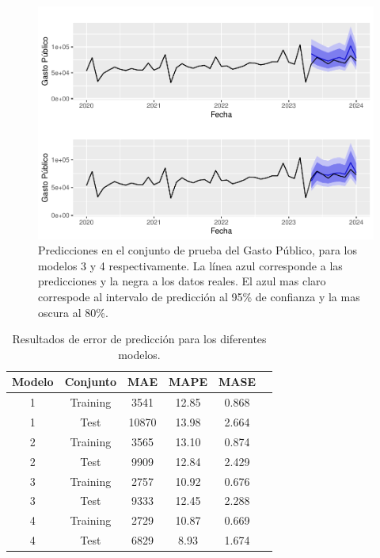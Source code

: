 \documentclass[
  12pt,
]{article}
\begin{document}
\begin{figure}[H]

{\centering \includegraphics[width=0.95\linewidth]{informe_files/figure-latex/unnamed-chunk-22-1}

}

\caption{\label{fig:unnamed-chunk-22} Predicciones en el conjunto de prueba del Gasto
Público, para los modelos 3 y 4 respectivamente. La línea azul
corresponde a las predicciones y la negra a los datos reales. El azul
mas claro correspode al intervalo de predicción al 95\% de confianza y
la mas oscura al 80\%.}

\end{figure}

\begin{table}[H]
\centering
\begin{tabular}{c c c c c c}
\hline
Modelo & Conjunto & MAE & MAPE & MASE \\ \hline
1 & Training  & 3541 & 12.85 & 0.868 \\ 
1 & Test      & 10870 & 13.98 & 2.664 \\ \hline
2 & Training  & 3565 & 13.10 & 0.874 \\ 
2 & Test      & 9909 & 12.84 & 2.429 \\ \hline
3 & Training  & 2757 & 10.92 & 0.676 \\ 
3 & Test      & 9333 & 12.45 & 2.288 \\ \hline
4 & Training  & 2729 & 10.87 & 0.669 \\ 
4 & Test      & 6829 & 8.93 & 1.674 \\ \hline
\end{tabular}
\caption{Resultados de error de predicción para los diferentes modelos.}
\label{tab:metricas}
\end{table}
\end{document}
